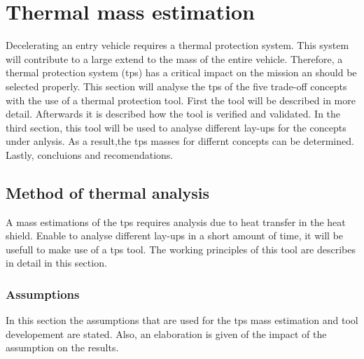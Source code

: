 \section{Thermal mass estimation}
\label{ch:thermtool}
Decelerating an entry vehicle requires a thermal protection system. This system will contribute to a large extend to the mass of the entire vehicle. Therefore, a thermal protection system (\gls{tps}) has a critical impact on the mission an should be selected properly. This section will analyse the \gls{tps} of the five trade-off concepts with the use of a thermal protection tool. First the tool will be described in more detail. Afterwards it is described how the tool is verified and validated. In the third section, this tool will be used to analyse different lay-ups for the concepts under anlysis. As a result,the \gls{tps} masses for differnt concepts can be determined. Lastly, concluions and recomendations.

\subsection{Method of thermal analysis}
A mass estimations of the \gls{tps} requires analysis due to heat transfer in the heat shield. Enable to analyse different lay-ups in a short amount of time, it will be usefull to make use of a \gls{tps} tool. The working principles of this tool are describes in detail in this section.

\subsubsection{Assumptions}
In this section the assumptions that are used for the \gls{tps} mass estimation and tool developement are stated. Also, an elaboration is given of the impact of the assumption on the results.

